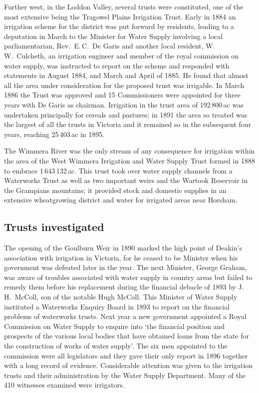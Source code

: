 Further west, in the Loddon Valley, several trusts were constituted,
one of the most extensive being the Tragowel Plains Irrigation Trust.
Early in 1884 an irrigation scheme for the district was put forward by
residents, leading to a deputation in March to the Minister for Water
Supply involving a local parliamentarian, Rev.~E.\,C.~De Garis and
another local resident, W.\,W.~Culcheth, an irrigation engineer and
member of the royal commission on water supply, was instructed to
report on the scheme and responded with statements in August 1884, and
March and April of 1885.  He found that
almost all the area under consideration for the proposed trust was
irrigable.  In March 1886 the Trust was approved and 15 Commissioners
were appointed for three years with De Garis as chairman.  Irrigation
in the trust area of 192\,800\,ac was undertaken principally for
cereals and pastures; in 1891 the area so treated was the largest of
all the trusts in Victoria and it remained so in the subsequent four
years, reaching 25\,403\,ac in 1895.

The Wimmera River was the only stream of any consequence for
irrigation within the area of the West Wimmera Irrigation and Water
Supply Trust formed in 1888 to embrace 1\,643\,132\,ac. This trust
took over water supply channels from a Waterworks Trust as well as two
important weirs and the Wartook Reservoir in the Grampians mountains;
it provided stock and domestic supplies in an extensive wheatgrowing
district and water for irrigated areas near Horsham.

\subsection*{Trusts investigated}

The opening of the Goulburn Weir in 1890 marked the high point of
Deakin's association with irrigation in Victoria, for he ceased to be
Minister when his government was defeated later in the year.  The next
Minister, George Graham, was aware of troubles associated with water
supply in country areas but failed to remedy them before his
replacement during the financial debacle of 1893 by J.\,H.~McColl, son
of the notable Hugh McColl.  This Minister of Water Supply instituted
a Waterworks Enquiry Board in 1893 to report on the financial problems
of waterworks trusts.  Next year a
new government appointed a Royal Commission on Water Supply to enquire
into `the financial position and prospects of the various local bodies
that have obtained loans from the state for the construction of works
of water supply'.
The six men appointed to the commission were all legislators and they
gave their only report in 1896 together with a long record of
evidence.  Considerable attention was given to the irrigation trusts
and their administration by the Water Supply Department.  Many of the
410 witnesses examined were irrigators.

